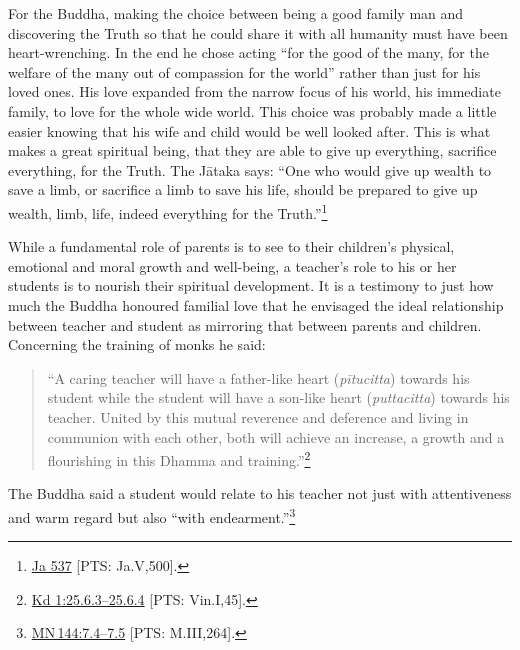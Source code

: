 \documentclass[10pt, openright]{book}
\begin{document}
For the Buddha, making the choice between being a good family man and discovering the Truth so that he could share it with all humanity must have been heart-wrenching. In the end he chose acting “for the good of the many, for the welfare of the many out of compassion for the world” rather than just for his loved ones. His love expanded from the narrow focus of his world, his immediate family, to love for the whole wide world. This choice was probably made a little easier knowing that his wife and child would be well looked after. This is what makes a great spiritual being, that they are able to give up everything, sacrifice everything, for the Truth. The Jātaka says: “One who would give up wealth to save a limb, or sacrifice a limb to save his life, should be prepared to give up wealth, limb, life, indeed everything for the Truth.”\footnote {\href{https://suttacentral.net/ja537/en/francis?reference=main/pts#pts-vp-pli500}{Ja 537} [PTS: Ja.V,500].}


While a fundamental role of parents is to see to their children’s physical, emotional and moral growth and well-being, a teacher’s role to his or her students is to nourish their spiritual development. It is a testimony to just how much the Buddha honoured familial love that he envisaged the ideal relationship between teacher and student as mirroring that between parents and children. Concerning the training of monks he said:


\begin{quote}

\hspace{-0.4em}“A caring teacher will have a father-like heart (\textit{pītucitta}) towards his student while the student will have a son-like heart (\textit{puttacitta}) towards his teacher. United by this mutual reverence and deference and living in communion with each other, both will achieve an increase, a growth and a flourishing in this Dhamma and training.”\footnote {\href{https://suttacentral.net/pli-tv-kd1/en/brahmali#25.6.3}{Kd 1:25.6.3–25.6.4} [PTS: Vin.I,45].}


\end{quote}
The Buddha said a student would relate to his teacher not just with attentiveness and warm regard but also “with endearment.”\footnote {\href{https://suttacentral.net/mn144/en/sujato\#7.4}{MN 144:7.4–7.5} [PTS: M.III,264].}
\end{document}
